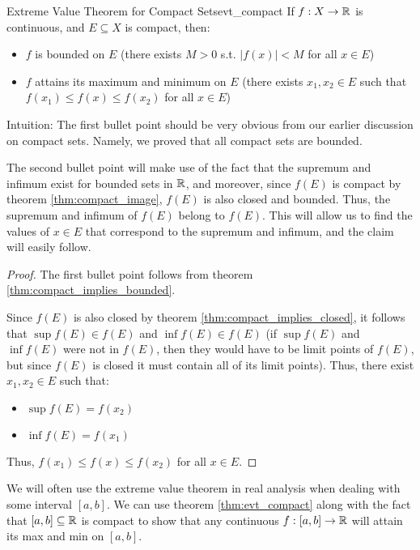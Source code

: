 \begin{thm}{Extreme Value Theorem for Compact Sets}{evt_compact}
If \(f: X \to {\mathbb R}\) is continuous, and \(E \subseteq X\) is compact, then:
\begin{itemize}
  \item \(f\) is bounded on \(E\) (there exists \(M > 0\) s.t. \(|f(x)| < M\) for all \(x \in E\))
  \item \(f\) attains its maximum and minimum on \(E\) (there exists \(x_1, x_2 \in E\) such that \(f(x_1) \leq f(x) \leq f(x_2)\) for all \(x \in E\)) 
\end{itemize}

Intuition: The first bullet point should be very obvious from our earlier discussion on compact sets. Namely, we proved that all compact sets are bounded. \newline 

The second bullet point will make use of the fact that the supremum and infimum exist for bounded sets in \({\mathbb R}\), and moreover, since \(f(E)\) is compact by theorem \ref{thm:compact_image}, \(f(E)\) is also closed and bounded. Thus, the supremum and infimum of \(f(E)\) belong to \(f(E)\). This will allow us to find the values of \(x \in E\) that correspond to the supremum and infimum, and the claim will easily follow. \newline 
\begin{proof}
The first bullet point follows from theorem \ref{thm:compact_implies_bounded}. \newline 

Since \(f(E)\) is also closed by theorem \ref{thm:compact_implies_closed}, it follows that \(\sup f(E) \in f(E)\) and \(\inf f(E) \in f(E)\) (if \(\sup f(E)\) and \(\inf f(E)\) were not in \(f(E)\), then they would have to be limit points of \(f(E)\), but since \(f(E)\) is closed it must contain all of its limit points). Thus, there exist \(x_1,x_2 \in E\) such that:
\begin{itemize}
  \item \(\sup f(E) = f(x_2)\)
  \item \(\inf f(E) = f(x_1)\)
\end{itemize}
Thus, \(f(x_1) \leq f(x) \leq f(x_2)\) for all \(x \in E\).
\end{proof}


\end{thm}
\begin{exmp}{}{}
We will often use the extreme value theorem in real analysis when dealing with some interval \([a,b]\). We can use theorem \ref{thm:evt_compact} along with the fact that \([a,b]\subseteq {\mathbb R}\) is compact to show that any continuous \(f: [a,b] \to {\mathbb R}\) will attain its max and min on \([a,b]\).

\end{exmp}

